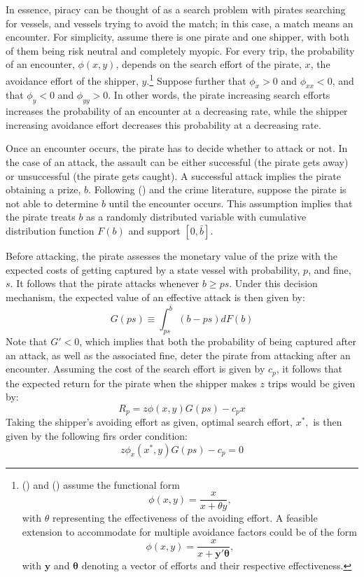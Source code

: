 \documentclass[11pt, oneside]{article}   	%
\begin{document}
In essence, piracy can be thought of as a search problem with pirates searching for vessels, and vessels trying to avoid the match; in this case, a match means an encounter. For simplicity, assume there is one pirate and one shipper, with both of them being risk neutral and completely myopic. For every trip, the probability of an encounter, $\phi(x,y)$, depends on the search effort of the pirate, $x$, the avoidance effort of the shipper, $y$.\footnote{\citeauthor{grossman1995swords} (\citeyear{grossman1995swords}) and \citeauthor{hallwood2013economic} (\citeyear{hallwood2013economic}) assume the functional form $$\phi(x,y)=\frac{x}{x+\theta y},$$ with $\theta$ representing the effectiveness of the avoiding effort. A feasible extension to accommodate for multiple avoidance factors could be of the form $$\phi(x,y)=\frac{x}{x+\pmb{y}'\pmb{\theta}},$$ with $\pmb{y}$ and $\pmb{\theta}$ denoting a vector of efforts and their respective effectiveness.} Suppose further that $\phi_x>0$ and $\phi_{xx}<0$, and that  $\phi_y<0$ and $\phi_{yy}>0$. In other words, the pirate increasing search efforts increases the probability of an encounter at a decreasing rate, while the shipper increasing avoidance effort decreases this probability at a decreasing rate.

Once an encounter occurs, the pirate has to decide whether to attack or not. In the case of an attack, the assault can be either successful (the pirate gets away) or unsuccessful (the pirate gets caught). A successful attack implies the pirate obtaining a prize, $b$. Following \citeauthor{hallwood2013economic} (\citeyear{hallwood2013economic}) and the crime literature, suppose the pirate is not able to determine $b$ until the encounter occurs. This assumption implies that the pirate treats $b$ as a randomly distributed variable with cumulative distribution function $F(b)$ and support $[0,\bar b]$.

Before attacking, the pirate assesses the monetary value of the prize with the expected costs of getting captured by a state vessel with probability, $p$, and fine, $s$. It follows that the pirate attacks whenever $b\geq ps$. Under this decision mechanism, the expected value of an effective attack is then given by:
\begin{equation}
G(ps)\equiv \int_{ps}^{\bar b}(b-ps)dF(b)
\end{equation}
Note that $G'<0$, which implies that both the probability of being captured after an attack, as well as the associated fine, deter the pirate from attacking after an encounter. Assuming the cost of the search effort is given by $c_p$, it follows that the expected return for the pirate when the shipper makes $z$ trips would be given by:
\begin{equation}
R_p=z\phi(x,y)G(ps)-c_px
\end{equation}
Taking the shipper's avoiding effort as given, optimal search effort, $x^*,$ is then given by the following firs order condition:
\begin{equation}
z\phi_x(x^*,y)G(ps)-c_p=0\label{optx}
\end{equation}
\end{document}
